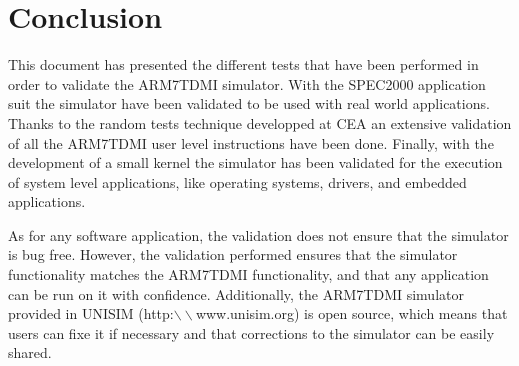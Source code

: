 \section{Conclusion}
\label{sec:conclusion}

This document has presented the different tests that have been performed in order to validate the ARM7TDMI simulator.
With the SPEC2000 application suit the simulator have been validated to be used with real world applications.
Thanks to the random tests technique developped at CEA an extensive validation of all the ARM7TDMI user level instructions have been done.
Finally, with the development of a small kernel the simulator has been validated for the execution of system level applications, like operating systems, drivers, and embedded applications.

As for any software application, the validation does not ensure that the simulator is bug free.
However, the validation performed ensures that the simulator functionality matches the ARM7TDMI functionality, and that any application can be run on it with confidence.
Additionally, the ARM7TDMI simulator provided in UNISIM (http:$\backslash\backslash$www.unisim.org) is open source, which means that users can fixe it if necessary and that corrections to the simulator can be easily shared.
